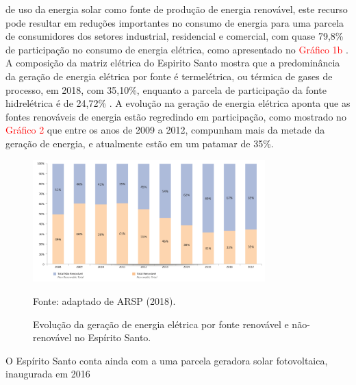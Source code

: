 \begin{onehalfspace}
    de uso da energia solar como fonte de produção de energia renovável, este recurso pode resultar 
    em reduções importantes no consumo de energia para uma parcela de consumidores dos setores 
    industrial, residencial e comercial, com quase 79,8\% de participação no consumo de energia 
    elétrica, como apresentado no \textcolor{red}{Gráfico 1b} \cite{Cronemberger2012,EmpresadePesquisaEnergetica-EPE2019,Sorgato2018,Sudhakar2019}.\vspace{0.3cm} \newline
    A composição da matriz elétrica do Espirito Santo mostra que a predominância da geração de 
    energia elétrica por fonte é termelétrica, ou térmica de gases de processo, em 2018, com 35,10\%, 
    enquanto a parcela de participação da fonte hidrelétrica é de 24,72\% \cite{AgenciadeRegulacaodeServicosPublicosdoEspiritoSanto-ARSP2018}.\vspace{0.3cm} \newline
    A evolução na geração de energia elétrica aponta que as fontes renováveis de energia estão 
    regredindo em participação, como mostrado no \textcolor{red}{Gráfico 2} que entre os anos de 
    2009 a 2012, compunham mais da metade da geração de energia, e atualmente estão em um 
    patamar de 35\%.\vspace*{-0.4cm}
    \begin{figure}[ht]
        \centering
        \caption{\small Evolução da geração de energia elétrica por fonte renovável e não-renovável no Espírito Santo.}
        \includegraphics[width=0.8\textwidth]{graphs/graph2_geracao_de_energia_eletrica_no_es-arsp_2018.png}
        \begin{flushleft}
            \par \small Fonte: adaptado de ARSP (2018).
        \end{flushleft}
        \label{fig:Grafico 2}
    \end{figure}\newline
    \noindent O Espírito Santo conta ainda com a uma parcela geradora solar fotovoltaica, inaugurada em 2016 

\end{onehalfspace}
